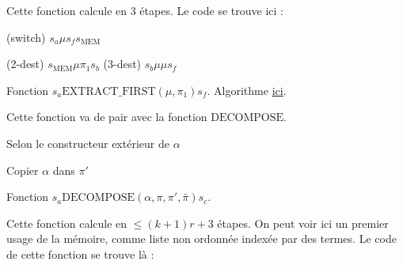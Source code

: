 \documentclass{report}
\begin{document}
\begin{appendices}
				\espace
				
				Cette fonction calcule en $3$ étapes. Le code se trouve ici :
				
				\espace
				
				\begin{algorithm}[H]
					\label{prog:A_RAM_fn_extract_first}
					
					(switch)	$s_a \mu s_f s_{\text{MEM}}$\;
					
					(2-dest) 	$s_{\text{MEM}} \mu \pi_1 s_b$\;
					(3-dest) 	$s_b \mu \mu s_f$\;
					
					
					\caption{Fonction $s_a \text{EXTRACT\_FIRST}(\mu, \pi_1) s_f$. Algorithme \hyperref[algo:A_RAM_fn_extract_first]{ici}. }
				\end{algorithm}
				
				\espace 
				
				Cette fonction va de pair avec la fonction $\text{DECOMPOSE}$.

				\espace 
				
				\begin{algorithm}[H]
					\label{algo:A_RAM_fn_DECOMPOSE}
					
					
					Selon le constructeur extérieur de $\alpha$ \;
					
					
					Copier $\alpha$ dans $\pi'$ \;
					
					\caption{Fonction $s_a \text{DECOMPOSE}(\alpha, \pi, \pi', \bar{\pi}) s_c$.}
				\end{algorithm}
				
				\espace
				
				Cette fonction calcule en $\leq (k+1)r+3$ étapes. On peut voir ici un premier usage de la mémoire, comme liste non ordonnée indexée par des termes. Le code de cette fonction se trouve là :
				
				\espace
				

\end{appendices}
\end{document}
